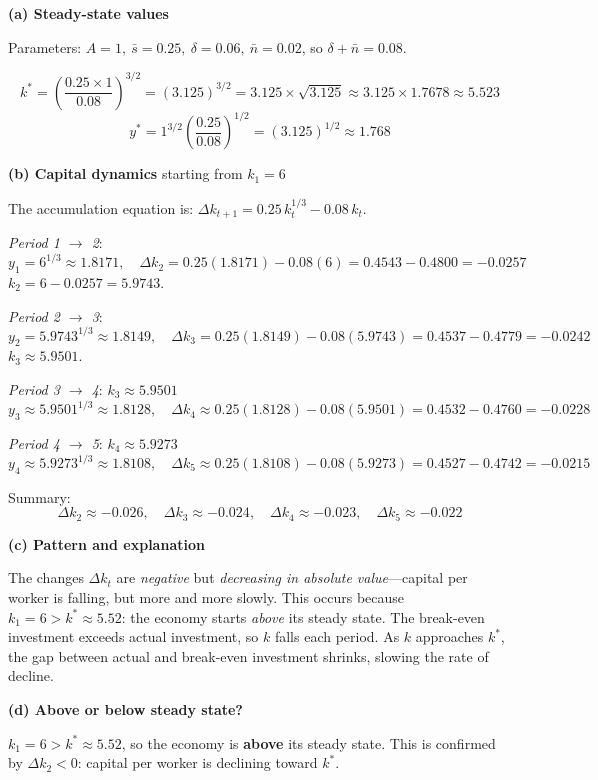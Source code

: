 \documentclass[12pt]{article}
\newenvironment{soln}{%
  \begin{tcolorbox}[
    breakable,
    colback=blue!4!white,
    colframe=blue!50!black,
    title={\textbf{Solution}},
    fonttitle=\small,
    left=4pt, right=4pt, top=4pt, bottom=4pt
  ]
}{%
  \end{tcolorbox}
}
\begin{document}
\begin{soln}
\textbf{(a) Steady-state values}

Parameters: $A=1,\ \bar{s}=0.25,\ \delta=0.06,\ \bar{n}=0.02$,
so $\delta+\bar{n}=0.08$.

\[
  k^* = \left(\frac{0.25\times 1}{0.08}\right)^{3/2}
  = (3.125)^{3/2}
  = 3.125 \times \sqrt{3.125}
  \approx 3.125 \times 1.7678
  \approx \mathbf{5.523}
\]
\[
  y^* = 1^{3/2}\left(\frac{0.25}{0.08}\right)^{1/2}
  = (3.125)^{1/2}
  \approx \mathbf{1.768}
\]

\textbf{(b) Capital dynamics} starting from $k_1 = 6$

The accumulation equation is:
$\Delta k_{t+1} = 0.25\,k_t^{1/3} - 0.08\,k_t.$

\medskip
\textit{Period 1 $\to$ 2}:
\[
  y_1 = 6^{1/3} \approx 1.8171, \quad
  \Delta k_2 = 0.25(1.8171) - 0.08(6)
  = 0.4543 - 0.4800 = -0.0257
\]
$k_2 = 6 - 0.0257 = 5.9743$.

\textit{Period 2 $\to$ 3}:
\[
  y_2 = 5.9743^{1/3} \approx 1.8149, \quad
  \Delta k_3 = 0.25(1.8149) - 0.08(5.9743)
  = 0.4537 - 0.4779 = -0.0242
\]
$k_3 \approx 5.9501$.

\textit{Period 3 $\to$ 4}: $k_3 \approx 5.9501$
\[
  y_3 \approx 5.9501^{1/3} \approx 1.8128, \quad
  \Delta k_4 \approx 0.25(1.8128) - 0.08(5.9501)
  = 0.4532 - 0.4760 = -0.0228
\]

\textit{Period 4 $\to$ 5}: $k_4 \approx 5.9273$
\[
  y_4 \approx 5.9273^{1/3} \approx 1.8108, \quad
  \Delta k_5 \approx 0.25(1.8108) - 0.08(5.9273)
  = 0.4527 - 0.4742 = -0.0215
\]

Summary:
\[
  \Delta k_2 \approx -0.026,\quad
  \Delta k_3 \approx -0.024,\quad
  \Delta k_4 \approx -0.023,\quad
  \Delta k_5 \approx -0.022
\]

\textbf{(c) Pattern and explanation}

The changes $\Delta k_t$ are \emph{negative} but \emph{decreasing in
absolute value}---capital per worker is falling, but more and more slowly.
This occurs because $k_1 = 6 > k^* \approx 5.52$: the economy starts
\emph{above} its steady state.  The break-even investment exceeds actual
investment, so $k$ falls each period.  As $k$ approaches $k^*$, the gap
between actual and break-even investment shrinks, slowing the rate of
decline.

\textbf{(d) Above or below steady state?}

$k_1 = 6 > k^* \approx 5.52$, so the economy is \textbf{above} its steady
state.  This is confirmed by $\Delta k_2 < 0$: capital per worker is
declining toward $k^*$.
\end{soln}
\end{document}
